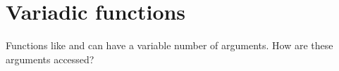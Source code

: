 \chapter{Variadic functions}

Functions like \printf and \scanf can have a variable number of arguments.
How are these arguments accessed?




